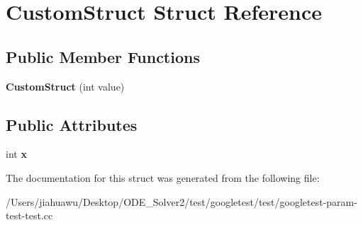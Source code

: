 \hypertarget{struct_custom_struct}{}\section{Custom\+Struct Struct Reference}
\label{struct_custom_struct}
\subsection*{Public Member Functions}
\begin{DoxyCompactItemize}
\item 
\mbox{\label{struct_custom_struct_aeab194957ba9e056e81c721e83c61941}} 
{\bfseries Custom\+Struct} (int value)
\end{DoxyCompactItemize}
\subsection*{Public Attributes}
\begin{DoxyCompactItemize}
\item 
\mbox{\label{struct_custom_struct_a436b0c2ffdab1f711fa40cfa3e246602}} 
int {\bfseries x}
\end{DoxyCompactItemize}


The documentation for this struct was generated from the following file\+:\begin{DoxyCompactItemize}
\item 
/\+Users/jiahuawu/\+Desktop/\+O\+D\+E\+\_\+\+Solver2/test/googletest/test/googletest-\/param-\/test-\/test.\+cc\end{DoxyCompactItemize}
